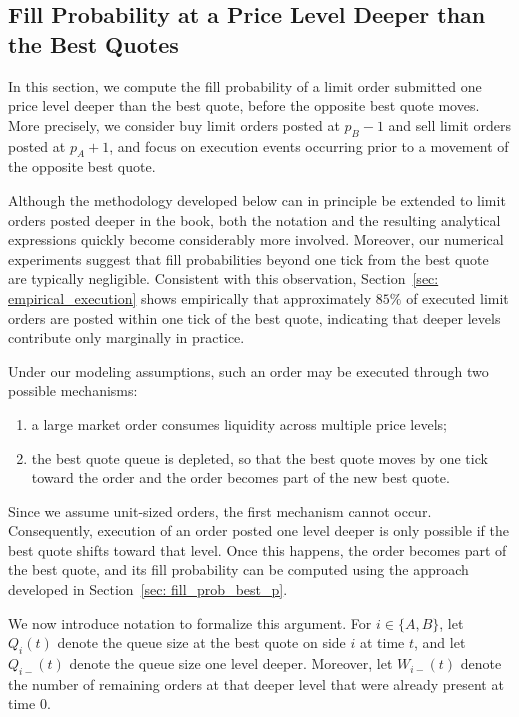 \documentclass[11pt]{article}
\begin{document}
\subsection{Fill Probability at a Price Level Deeper than the Best Quotes}\label{sec: fill_prob_level2}

In this section, we compute the fill probability of a limit order submitted one price level deeper than the best quote, before the opposite best quote moves. More precisely, we consider buy limit orders posted at $p_B-1$ and sell limit orders posted at $p_A+1$, and focus on execution events occurring prior to a movement of the opposite best quote.

Although the methodology developed below can in principle be extended to limit orders posted deeper in the book, both the notation and the resulting analytical expressions quickly become considerably more involved. Moreover, our numerical experiments suggest that fill probabilities beyond one tick from the best quote are typically negligible. Consistent with this observation, Section~\ref{sec: empirical_execution} shows empirically that approximately $85\%$ of executed limit orders are posted within one tick of the best quote, indicating that deeper levels contribute only marginally in practice.

Under our modeling assumptions, such an order may be executed through two possible mechanisms:
\begin{enumerate}
    \item a large market order consumes liquidity across multiple price levels;
    \item the best quote queue is depleted, so that the best quote moves by one tick toward the order and the order becomes part of the new best quote.
\end{enumerate}
Since we assume unit-sized orders, the first mechanism cannot occur. Consequently, execution of an order posted one level deeper is only possible if the best quote shifts toward that level. Once this happens, the order becomes part of the best quote, and its fill probability can be computed using the approach developed in Section~\ref{sec: fill_prob_best_p}.

\medskip
We now introduce notation to formalize this argument. For $i\in\{A,B\}$, let $Q_i(t)$ denote the queue size at the best quote on side $i$ at time $t$, and let $Q_{i-}(t)$ denote the queue size one level deeper. Moreover, let $W_{i-}(t)$ denote the number of remaining orders at that deeper level that were already present at time $0$.
\end{document}
